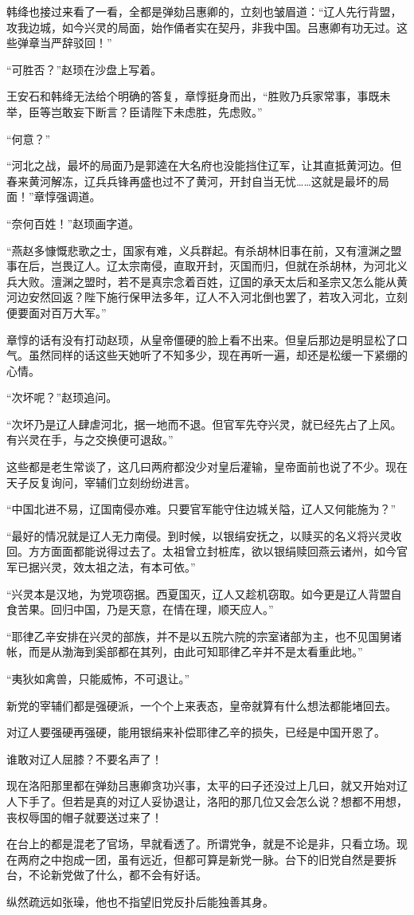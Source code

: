 韩绛也接过来看了一看，全都是弹劾吕惠卿的，立刻也皱眉道：“辽人先行背盟，攻我边城，如今兴灵的局面，始作俑者实在契丹，非我中国。吕惠卿有功无过。这些弹章当严辞驳回！”

“可胜否？”赵顼在沙盘上写着。

王安石和韩绛无法给个明确的答复，章惇挺身而出，“胜败乃兵家常事，事既未举，臣等岂敢妄下断言？臣请陛下未虑胜，先虑败。”

“何意？”

“河北之战，最坏的局面乃是郭逵在大名府也没能挡住辽军，让其直抵黄河边。但春来黄河解冻，辽兵兵锋再盛也过不了黄河，开封自当无忧……这就是最坏的局面！”章惇强调道。

“奈何百姓！”赵顼画字道。

“燕赵多慷慨悲歌之士，国家有难，义兵群起。有杀胡林旧事在前，又有澶渊之盟事在后，岂畏辽人。辽太宗南侵，直取开封，灭国而归，但就在杀胡林，为河北义兵大败。澶渊之盟时，若不是真宗念着百姓，辽国的承天太后和圣宗又怎么能从黄河边安然回返？陛下施行保甲法多年，辽人不入河北倒也罢了，若攻入河北，立刻便要面对百万大军。”

章惇的话有没有打动赵顼，从皇帝僵硬的脸上看不出来。但皇后那边是明显松了口气。虽然同样的话这些天她听了不知多少，现在再听一遍，却还是松缓一下紧绷的心情。

“次坏呢？”赵顼追问。

“次坏乃是辽人肆虐河北，据一地而不退。但官军先夺兴灵，就已经先占了上风。有兴灵在手，与之交换便可退敌。”

这些都是老生常谈了，这几曰两府都没少对皇后灌输，皇帝面前也说了不少。现在天子反复询问，宰辅们立刻纷纷进言。

“中国北进不易，辽国南侵亦难。只要官军能守住边城关隘，辽人又何能施为？”

“最好的情况就是辽人无力南侵。到时候，以银绢安抚之，以赎买的名义将兴灵收回。方方面面都能说得过去了。太祖曾立封桩库，欲以银绢赎回燕云诸州，如今官军已据兴灵，效太祖之法，有本可依。”

“兴灵本是汉地，为党项窃据。西夏国灭，辽人又趁机窃取。如今更是辽人背盟自食苦果。回归中国，乃是天意，在情在理，顺天应人。”

“耶律乙辛安排在兴灵的部族，并不是以五院六院的宗室诸部为主，也不见国舅诸帐，而是从渤海到奚部都在其列，由此可知耶律乙辛并不是太看重此地。”

“夷狄如禽兽，只能威怖，不可退让。”

新党的宰辅们都是强硬派，一个个上来表态，皇帝就算有什么想法都能堵回去。

对辽人要强硬再强硬，能用银绢来补偿耶律乙辛的损失，已经是中国开恩了。

谁敢对辽人屈膝？不要名声了！

现在洛阳那里都在弹劾吕惠卿贪功兴事，太平的曰子还没过上几曰，就又开始对辽人下手了。但若是真的对辽人妥协退让，洛阳的那几位又会怎么说？想都不用想，丧权辱国的帽子就要送过来了！

在台上的都是混老了官场，早就看透了。所谓党争，就是不论是非，只看立场。现在两府之中抱成一团，虽有远近，但都可算是新党一脉。台下的旧党自然是要拆台，不论新党做了什么，都不会有好话。

纵然疏远如张璪，他也不指望旧党反扑后能独善其身。
